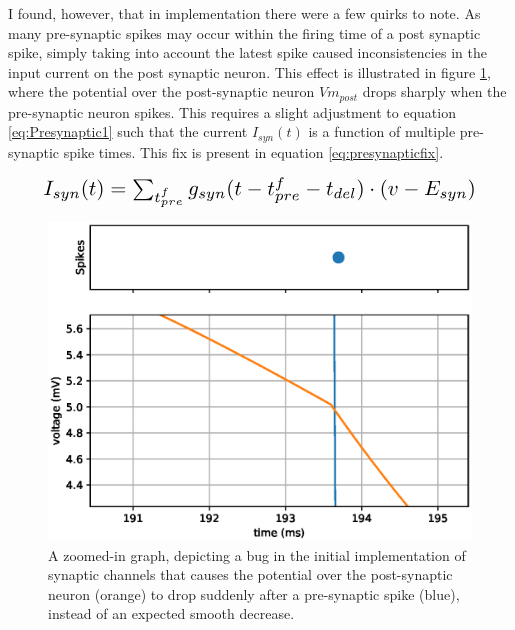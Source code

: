 I found, however, that in implementation there were a few quirks to note. As
many pre-synaptic spikes may occur within the firing time of a post synaptic
spike, simply taking into account the latest spike caused inconsistencies in the
input current on the post synaptic neuron. This effect is illustrated in figure
\ref{fig:LIFDUALBUG}, where the potential over the post-synaptic neuron
$Vm_{post}$ drops sharply when the pre-synaptic neuron spikes. This requires a
slight adjustment to equation \ref{eq:Presynaptic1} such that the current
$I_{syn}(t)$ is a function of multiple pre-synaptic spike times. This fix is
present in equation \ref{eq:presynapticfix}.

\begin{equation}\label{eq:presynapticfix}
    \scalebox{1.5}{$
        I_{syn}(t) = \sum_{t^f_{pre}} g_{syn}(t-t^f_{pre}-t_{del})\cdot(v-E_{syn})
    $}\end{equation}
\vspace{1ex}

\begin{figure}[ht]
    \centering
    \includegraphics[width=0.6\linewidth]{figures/graphs/bugZoomed.eps}
    \caption[Graph depicting a bug in the initial implementation of synaptic channels]{A zoomed-in graph, depicting a bug in the initial implementation of synaptic channels that causes the potential over the post-synaptic neuron (orange) to drop suddenly after a pre-synaptic spike (blue), instead of an expected smooth decrease.}
    \label{fig:LIFDUALBUG}
\end{figure}




